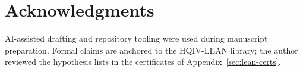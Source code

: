 \documentclass[11pt]{amsart}
\begin{document}
\section*{Acknowledgments}
AI-assisted drafting and repository tooling were used during manuscript preparation. Formal claims are anchored to the HQIV-LEAN library; the author reviewed the hypothesis lists in the certificates of Appendix~\ref{sec:lean-certs}.



\end{document}
